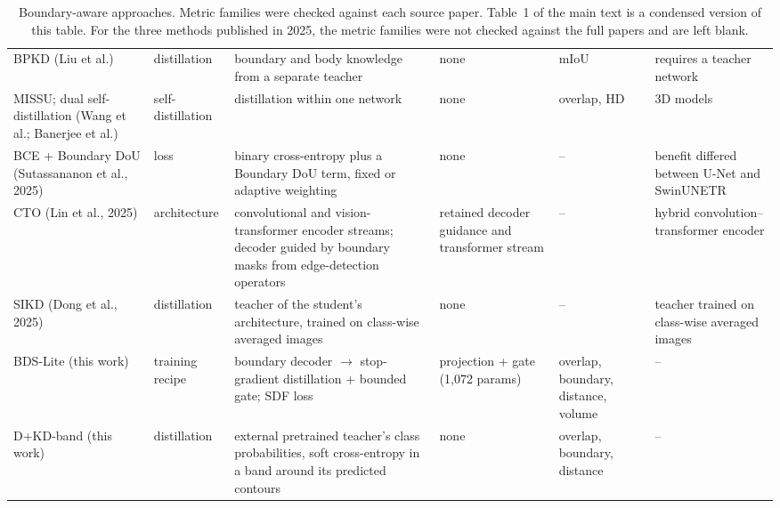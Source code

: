 \documentclass[10pt]{article}
\begin{document}
\begin{table}[!htbp]
{\begin{tabular}{p{2.6cm}p{1.8cm}p{3.8cm}p{1.6cm}p{2.6cm}p{3.6cm}}
BPKD (Liu et al.) & distillation & boundary and body knowledge from a separate teacher & none & mIoU & requires a teacher network \\
MISSU; dual self-distillation (Wang et al.; Banerjee et al.) & self-distillation & distillation within one network & none & overlap, HD & 3D models \\
BCE + Boundary DoU (Sutassananon et al., 2025) & loss & binary cross-entropy plus a Boundary DoU term, fixed or adaptive weighting & none & -- & benefit differed between U-Net and SwinUNETR \\
CTO (Lin et al., 2025) & architecture & convolutional and vision-transformer encoder streams; decoder guided by boundary masks from edge-detection operators & retained decoder guidance and transformer stream & -- & hybrid convolution--transformer encoder \\
SIKD (Dong et al., 2025) & distillation & teacher of the student's architecture, trained on class-wise averaged images & none & -- & teacher trained on class-wise averaged images \\
BDS-Lite (this work) & training recipe & boundary decoder $\to$ stop-gradient distillation + bounded gate; SDF loss & projection + gate (1,072 params) & overlap, boundary, distance, volume & -- \\
D+KD-band (this work) & distillation & external pretrained teacher's class probabilities, soft cross-entropy in a band around its predicted contours & none & overlap, boundary, distance & -- \\
\bottomrule
\end{tabular}}
\caption{\label{tab:s-methods}Boundary-aware approaches. Metric families were checked against each source paper. Table~1 of the main text is a condensed version of this table. For the three methods published in 2025, the metric families were not checked against the full papers and are left blank.}
\end{table}
\FloatBarrier
\end{document}
